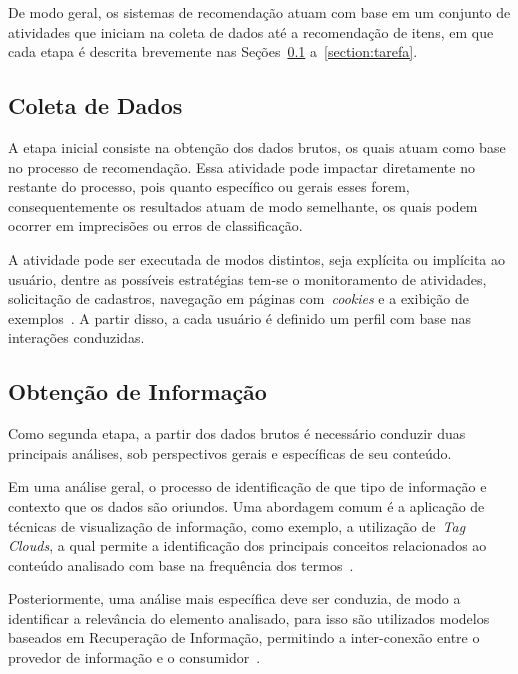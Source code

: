 \documentclass{svproc}
\begin{document}
De modo geral, os sistemas de recomendação atuam com base em um conjunto de atividades que iniciam na coleta de dados até a recomendação de itens, em que cada etapa é descrita brevemente nas Seções~\ref{section:coleta} a~\ref{section:tarefa}.

\subsection{Coleta de Dados}
\label{section:coleta}
A etapa inicial consiste na obtenção dos dados brutos, os quais atuam como base no processo de recomendação.
Essa atividade pode impactar diretamente no restante do processo, pois quanto específico ou gerais esses forem, consequentemente os resultados atuam de modo semelhante, os quais podem ocorrer em imprecisões ou erros de classificação.

A atividade pode ser executada de modos distintos, seja explícita ou implícita ao usuário, dentre as possíveis estratégias tem-se o monitoramento de atividades, solicitação de cadastros, navegação em páginas com~\emph{cookies} e a exibição de exemplos~\cite{cazella2010ciencia,reategui2006personalizaccao}.
A partir disso, a cada usuário é definido um perfil com base nas interações conduzidas.


\subsection{Obtenção de Informação}
\label{section:obtencao}
Como segunda etapa, a partir dos dados brutos é necessário conduzir duas principais análises, sob perspectivos gerais e específicas de seu conteúdo.

Em uma análise geral, o processo de identificação de que tipo de informação e contexto que os dados são oriundos. 
Uma abordagem comum é a aplicação de técnicas de visualização de informação, como exemplo, a utilização de~\emph{Tag Clouds}, a qual permite a identificação dos principais conceitos relacionados ao conteúdo analisado com base na frequência dos termos~\cite{luis2017analise}.

Posteriormente, uma análise mais específica deve ser conduzia, de modo a identificar a relevância do elemento analisado, para isso são utilizados modelos baseados em Recuperação de Informação, permitindo a inter-conexão entre o provedor de informação e o consumidor~\cite{souza2006sistemas}.
\end{document}
